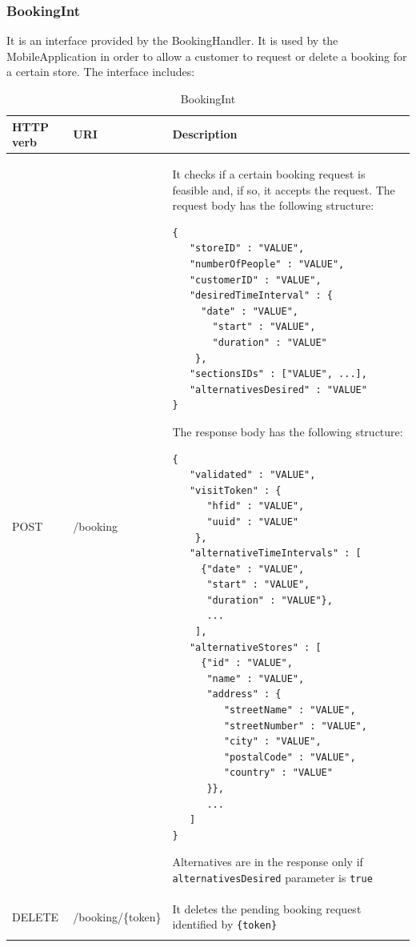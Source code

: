 \documentclass[a4paper,oneside,11pt]{book}
\begin{document}
    \subsubsection{BookingInt}
    It is an interface provided by the BookingHandler. It is used by the MobileApplication in order to allow a customer to request or delete a booking for a certain store. The interface includes:
    \begin{longtable}[c] { |>{\centering\arraybackslash}H{0.11\textwidth}|>{\centering\arraybackslash\ttfamily}P{0.23\textwidth}|H{0.50\textwidth}| }
        \hline
        \textbf{HTTP verb} & \textrm{\textbf{URI}} & \textbf{\textbf{Description}} \\ \hline
        POST & /booking & It checks if a certain booking request is feasible and, if so, it accepts the request. The request body has the following structure:
        \begin{lstlisting}[language=jsonDD]
{
   "storeID" : "VALUE",
   "numberOfPeople" : "VALUE",
   "customerID" : "VALUE",
   "desiredTimeInterval" : {
     "date" : "VALUE",
       "start" : "VALUE",
       "duration" : "VALUE"
    },
   "sectionsIDs" : ["VALUE", ...],
   "alternativesDesired" : "VALUE"
}
        \end{lstlisting}
        The response body has the following structure:
        \begin{lstlisting}[language=jsonDD]
{
   "validated" : "VALUE",
   "visitToken" : {
      "hfid" : "VALUE",
      "uuid" : "VALUE"
    },
   "alternativeTimeIntervals" : [
     {"date" : "VALUE",
      "start" : "VALUE",
      "duration" : "VALUE"},
      ...
    ],
   "alternativeStores" : [
     {"id" : "VALUE",
      "name" : "VALUE",
      "address" : {
         "streetName" : "VALUE",
         "streetNumber" : "VALUE",
         "city" : "VALUE",
         "postalCode" : "VALUE",
         "country" : "VALUE"
      }},
      ...
   ]
}
        \end{lstlisting}
        Alternatives are in the response only if \texttt{alternativesDesired} parameter is \texttt{true}
        \\ \hline
        DELETE & /booking/\{token\} & It deletes the pending booking request identified by \texttt{\{token\}} \\ \hline
        \caption{BookingInt}
        \label{table:booking_int}
    \end{longtable}
    
\end{document}
